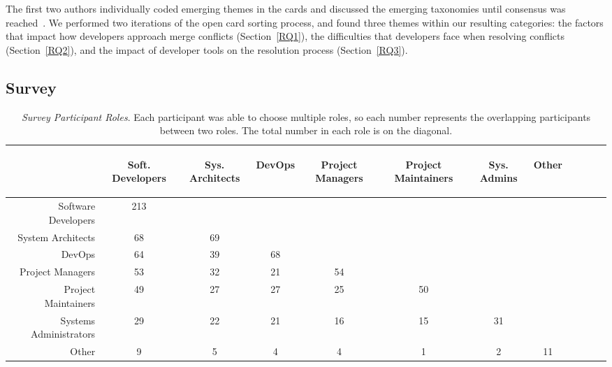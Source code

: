 The first two authors individually coded emerging themes in the cards and discussed the emerging taxonomies until consensus was reached~\cite{card_sort}.
We performed two iterations of the open card sorting process, and found three themes within our resulting categories: the factors that impact how developers approach merge conflicts (Section~\ref{RQ1}), the difficulties that developers face when resolving conflicts (Section~\ref{RQ2}), and the impact of developer tools on the resolution process (Section~\ref{RQ3}).


\subsection{Survey}\label{survey_methods}

\begin{table}[!]
\renewcommand{\arraystretch}{1.3}
\caption{\textit{Survey Participant Roles}. Each participant was able to choose multiple roles, so each number represents the overlapping participants between two roles. The total number in each role is on the diagonal.}
\label{survey_roles}
\centering
\begin{tabularx}{0.45\textwidth}{@{}r|*{10}{C}c@{}}
\toprule
\addlinespace[5.4em]
	& \begin{rotate}{45} Soft. Developers \end{rotate} 
	& \begin{rotate}{45} Sys. Architects \end{rotate} 
	& \begin{rotate}{45} DevOps \end{rotate} 
	& \begin{rotate}{45} Project Managers \end{rotate}
	& \begin{rotate}{45} Project Maintainers \end{rotate}
	& \begin{rotate}{45} Sys. Admins \end{rotate}
	& \begin{rotate}{45} Other \end{rotate}\\
\midrule
	Software Developers & 213 & & & & & & \\
	System Architects & 68 & 69 & & & & & \\
	DevOps & 64 & 39 & 68 & & & & \\
	Project Managers & 53 & 32 & 21 & 54 & & & \\
	Project Maintainers & 49 & 27 & 27 & 25 & 50 & & \\
	Systems Administrators & 29 & 22 & 21 & 16 & 15 & 31 & \\
	Other & 9 & 5 & 4 & 4 & 1 & 2 & 11 \\
\bottomrule
\end{tabularx}
\end{table}

